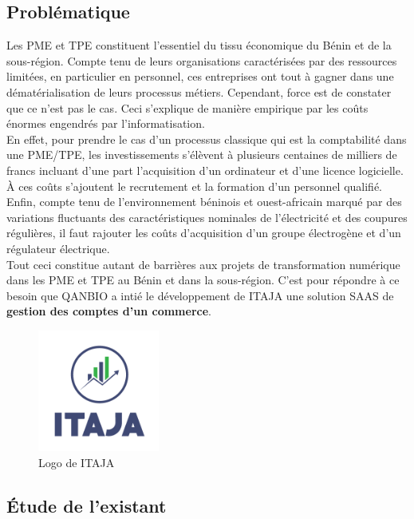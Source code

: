 \documentclass[12pt]{report}
\begin{document}
      \subsection{Problématique}
	Les \gls{PME} et \gls{TPE} constituent l’essentiel du tissu économique du Bénin et de la sous-région. Compte tenu de leurs organisations caractérisées par des ressources limitées, en particulier en personnel, ces entreprises ont tout à gagner dans une dématérialisation de leurs processus métiers. Cependant, force est de constater que ce n’est pas le cas. Ceci s’explique de manière empirique par les coûts énormes engendrés par l’informatisation.
	\\En effet, pour prendre le cas d’un processus classique qui est la comptabilité dans une PME/TPE, les investissements s’élèvent à plusieurs centaines de milliers de francs incluant d’une part l’acquisition d’un ordinateur et d’une licence logicielle. À ces coûts s’ajoutent le recrutement et la formation d’un personnel qualifié. Enfin, compte tenu de l’environnement béninois et ouest-africain marqué par des variations fluctuants des caractéristiques nominales de l'électricité et des coupures régulières, il faut rajouter les coûts d’acquisition d’un groupe électrogène et d’un régulateur électrique.
	\\Tout ceci constitue autant de barrières aux projets de transformation numérique dans les  PME et TPE au Bénin et dans la sous-région. C’est pour répondre à ce besoin que QANBIO a intié le développement de ITAJA une solution \gls{SAAS} de \textbf{gestion des comptes d’un commerce}.
	
	\begin{figure}[H]
	  \begin{center}
	    \includegraphics[scale=0.5, width=4cm]{images/logoITAJA.png}
	    \caption{Logo de ITAJA}
	  \end{center}
	\end{figure}
    
      \subsection{Étude de l'existant}
\end{document}
